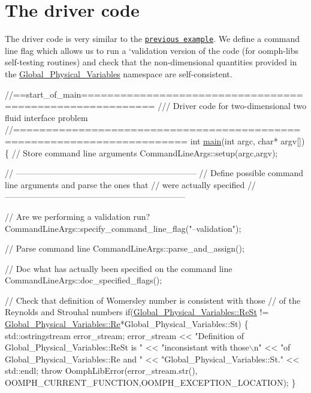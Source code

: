  

\hypertarget{index_main}{}\section{The driver code}\label{index_main}
The driver code is very similar to the \href{../../single_layer_free_surface/html/index.html#main}{\tt previous example}. We define a command line flag which allows us to run a `validation\textquotesingle{} version of the code (for {\ttfamily oomph-\/lib\textquotesingle{}s} self-\/testing routines) and check that the non-\/dimensional quantities provided in the {\ttfamily \hyperlink{namespaceGlobal__Physical__Variables}{Global\+\_\+\+Physical\+\_\+\+Variables}} namespace are self-\/consistent.


\begin{DoxyCodeInclude}
\textcolor{comment}{//==start\_of\_main=========================================================}
\textcolor{comment}{/// Driver code for two-dimensional two fluid interface problem}
\textcolor{comment}{}\textcolor{comment}{//========================================================================}
\textcolor{keywordtype}{int} \hyperlink{elastic__two__layer__interface_8cc_a0ddf1224851353fc92bfbff6f499fa97}{main}(\textcolor{keywordtype}{int} argc, \textcolor{keywordtype}{char}* argv[]) 
\{
 \textcolor{comment}{// Store command line arguments}
 CommandLineArgs::setup(argc,argv);

 \textcolor{comment}{// -----------------------------------------------------------------}
 \textcolor{comment}{// Define possible command line arguments and parse the ones that}
 \textcolor{comment}{// were actually specified}
 \textcolor{comment}{// -----------------------------------------------------------------}

 \textcolor{comment}{// Are we performing a validation run?}
 CommandLineArgs::specify\_command\_line\_flag(\textcolor{stringliteral}{"--validation"});

 \textcolor{comment}{// Parse command line}
 CommandLineArgs::parse\_and\_assign();

 \textcolor{comment}{// Doc what has actually been specified on the command line}
 CommandLineArgs::doc\_specified\_flags();

 \textcolor{comment}{// Check that definition of Womersley number is consistent with those}
 \textcolor{comment}{// of the Reynolds and Strouhal numbers}
 \textcolor{keywordflow}{if}(\hyperlink{namespaceGlobal__Physical__Variables_a085ee4bf968ffdd01a41b8c41864f907}{Global\_Physical\_Variables::ReSt} !=
    \hyperlink{namespaceGlobal__Physical__Variables_ab814e627d2eb5bc50318879d19ab16b9}{Global\_Physical\_Variables::Re}*Global\_Physical\_Variables::St)
  \{
   std::ostringstream error\_stream;
   error\_stream << \textcolor{stringliteral}{"Definition of Global\_Physical\_Variables::ReSt is "}
                << \textcolor{stringliteral}{"inconsistant with those\(\backslash\)n"}
                << \textcolor{stringliteral}{"of Global\_Physical\_Variables::Re and "}
                << \textcolor{stringliteral}{"Global\_Physical\_Variables::St."} << std::endl;
   \textcolor{keywordflow}{throw} OomphLibError(error\_stream.str(),
                       OOMPH\_CURRENT\_FUNCTION,OOMPH\_EXCEPTION\_LOCATION);
  \}


\end{DoxyCodeInclude}
